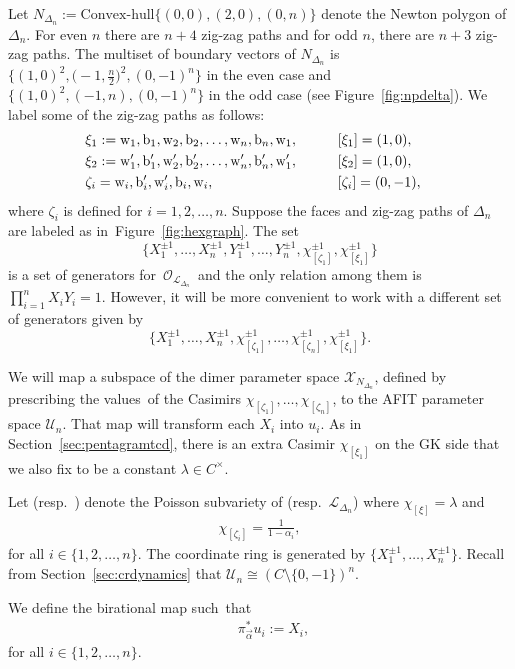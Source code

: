 \documentclass[10pt,a4paper]{amsart}
\numberwithin{equation}{section}
\newcommand{\C}{{\mathbb C}}
\newcommand{\ra}{\rightarrow}
\newcommand{\la}{\label}
\newcommand{\w}{{\rm w}}
\newcommand{\bw}{{\rm b}}
\def\C{C}
\begin{document}
	Let $N_{\Delta_n}:=\text{Convex-hull}\{(0,0), (2,0),(0,n)\}$ denote the Newton polygon of $\Delta_n$. For even $n$ there are $n+4$ zig-zag paths and for odd $n$, there are $n+3$ zig-zag paths. The multiset of boundary vectors of $N_{\Delta_n}$ is $\bigl\{(1,0)^2,\bigl(-1,\frac n2\bigr)^2,(0,-1)^n \bigr\}$ in the even case and $\bigl\{(1,0)^2,(-1,n),(0,-1)^n\bigr\}$ in the odd case (see Figure~\ref{fig:npdelta}). We label some of the zig-zag paths as follows:
	\begin{alignat*}{3}
		&\xi_{1}:= \w_1,\bw_1,\w_2,\bw_2,\dots,\w_{n},\bw_{n},\w_{1},  \qquad&& [\xi_1]=(1,0),&\\
		&\xi_{2}:= \w_1',\bw_1',\w_2',\bw_2',\dots,\w_{n}',\bw_{n}',\w_{1}', \qquad&& [\xi_2]=(1,0),&\\
		&\zeta_{i}= \w_{i}, \bw_{i}', \w_{i}', \bw_{i},\w_{i},    \qquad&& [\zeta_{i}]=(0,-1),&
	\end{alignat*}
	where $\zeta_i$ is defined for $i=1,2,\dots,n$. Suppose the faces and zig-zag paths of $\Delta_n$ are labeled as in~Figure~\ref{fig:hexgraph}. The set
\[
\bigl\{X_1^{\pm 1}, \dots,X_n^{\pm 1},Y_1^{\pm 1}, \dots,Y_n^{\pm 1},\chi_{[\zeta_1]}^{\pm 1},\chi_{[\xi_1]}^{\pm 1} \bigr\}
\]
 is a set of generators for~$\mathcal O_{{\mathcal L}_{\Delta_n}}$~and the only relation among them is $\prod_{i=1}^n X_i Y_i=1$. However, it will be more convenient to work with a different set of generators given by \[
 \bigl\{X_1^{\pm 1}, \dots,X_n^{\pm 1},\chi_{[\zeta_1]}^{\pm 1},\dots,\chi_{[\zeta_n]}^{\pm 1},\chi_{[\xi_1]}^{\pm 1}\bigr\}.
 \]
	
We will map a subspace of the dimer parameter space $\mathcal X_{N_{\Delta_n}}$, defined by prescribing the values~of the Casimirs $\chi_{[\zeta_1]},\dots,\chi_{[\zeta_n]}$, to the AFIT parameter space $\mathcal U_n$. That map will transform each $X_i$ into $u_i$. As in Section~\ref{sec:pentagramtcd}, there is an extra Casimir $\chi_{[\xi_1]}$ on the GK side that we also fix to be a constant $\lambda \in \C^\times$.
	
	
	Let  \big(resp.\ \big) denote the Poisson subvariety of  (resp.\ $\mathcal L_{\Delta_n}$) where $\chi_{[\xi]}=\lambda$ and
	\begin{align}
		\chi_{[\zeta_{i}]}= \frac{1}{1-\alpha_{i}}, \label{eq:chidelta}
	\end{align}
	for all $i \in \{1,2,\dots,n\}$. The coordinate ring  is generated by $\bigl\{X_1^{\pm 1}, \dots,X_n^{\pm 1}\bigr\}$. Recall from Section~\ref{sec:crdynamics} that $\mathcal U_n\cong (\C \setminus \{0,-1\})^n$.
	\begin{Definition}\label{def7.1}
		We define the birational map \smash{$\pi_{\vec \alpha} \colon \mathcal X_{N_{\Delta_n},\vec \alpha}^\lambda \supset \mathcal L_{{\Delta_n},\vec \alpha}^\lambda \!\ra\! (\C \setminus \{0,-1\})^n$} such~that
		\begin{align}\la{def:i}
			\qquad \pi_{\vec \alpha}^*u_i := X_i,
		\end{align}
		for all $i \in \{1,2,\dots,n\}$.
	\end{Definition}
\end{document}
